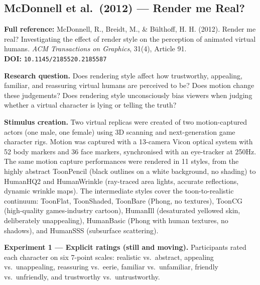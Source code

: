 \documentclass[11pt, a4paper]{article}
\begin{document}
\vspace{8pt}
\subsection{McDonnell et al.\ (2012) --- Render me Real?}

\begin{refbox}
\textbf{Full reference:} McDonnell, R., Breidt, M., \& B\"{u}lthoff, H. H. (2012). Render me real? Investigating the effect of render style on the perception of animated virtual humans. \textit{ACM Transactions on Graphics}, 31(4), Article 91.\\[4pt]
\textbf{DOI:} \texttt{10.1145/2185520.2185587}
\end{refbox}

\textbf{Research question.} Does rendering style affect how trustworthy, appealing, familiar, and reassuring virtual humans are perceived to be? Does motion change these judgements? Does rendering style unconsciously bias viewers when judging whether a virtual character is lying or telling the truth?

\textbf{Stimulus creation.} Two virtual replicas were created of two motion-captured actors (one male, one female) using 3D scanning and next-generation game character rigs. Motion was captured with a 13-camera Vicon optical system with 52 body markers and 36 face markers, synchronised with an eye-tracker at 250Hz. The same motion capture performances were rendered in 11 styles, from the highly abstract ToonPencil (black outlines on a white background, no shading) to HumanHQ2 and HumanWrinkle (ray-traced area lights, accurate reflections, dynamic wrinkle maps). The intermediate styles cover the toon-to-realistic continuum: ToonFlat, ToonShaded, ToonBare (Phong, no textures), ToonCG (high-quality games-industry cartoon), HumanIll (desaturated yellowed skin, deliberately unappealing), HumanBasic (Phong with human textures, no shadows), and HumanSSS (subsurface scattering).

\textbf{Experiment 1 --- Explicit ratings (still and moving).} Participants rated each character on six 7-point scales: realistic vs.\ abstract, appealing vs.\ unappealing, reassuring vs.\ eerie, familiar vs.\ unfamiliar, friendly vs.\ unfriendly, and trustworthy vs.\ untrustworthy.
\end{document}
